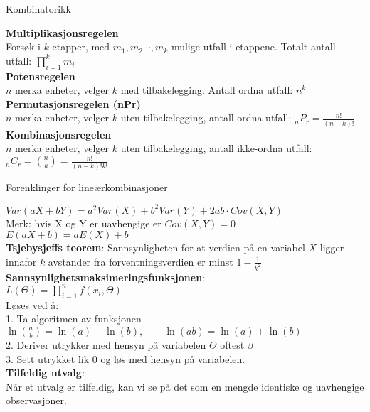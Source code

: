 \documentclass[final,hyperref={pdfpagelabels=false}]{beamer}
\begin{document}
\begin{frame}{} 
	\begin{columns}[t]
		\begin{column}{.33\linewidth}
			\begin{block}{}
				\center\normalsize Kombinatorikk\\
				{\footnotesize\raggedright
					\textbf{Multiplikasjonsregelen}\\
					Forsøk i $k$ etapper, med $m_1,m_2 \cdots,m_k$ mulige utfall i etappene. Totalt antall utfall: $\prod_{i=1}^k m_i$\\
					\textbf{Potensregelen}\\
					$n$ merka enheter, velger $k$ med tilbakelegging. Antall ordna utfall: $n^k$\\
					\textbf{Permutasjonsregelen (nPr)}\\
					$n$ merka enheter, velger $k$ uten tilbakelegging, antall ordna utfall: $_nP_r=\frac{n!}{(n-k)!}$\\
					\textbf{Kombinasjonsregelen}\\
					$n$ merka enheter, velger $k$ uten tilbakelegging, antall ikke-ordna utfall: $_nC_r=\binom{n}{k}=\frac{n!}{(n-k)!k!}$
				}
				\center\normalsize Forenklinger for lineærkombinasjoner\\
				{\footnotesize\raggedright
					$Var(aX+bY)=a^2Var(X)+b^2Var(Y)+2ab\cdot Cov(X,Y)$\\
					Merk: hvis X og Y er uavhengige er $Cov(X,Y)=0$\\
					$E(aX+b)=aE(X)+b$\\
					\textbf{Tsjebysjeffs teorem}: Sannsynligheten for at verdien på en variabel $X$ ligger innafor $k$ avstander fra forventningsverdien er minst $1-\frac{1}{k^2}$\\
					\textbf{Sannsynlighetsmaksimeringsfunksjonen}:\\
					$L(\Theta)=\prod_{i=1}^n f(x_i,\Theta)$\\
					Løses ved å:\\
					1. Ta algoritmen av funksjonen\\
					$\ln \left(\frac{a}{b}\right)=\ln(a)-\ln(b),\qquad \ln(ab)=\ln(a)+\ln(b)$\\
					2. Deriver utrykker med hensyn på variabelen $\Theta$ oftest $\beta$\\
					3. Sett utrykket lik $0$ og løs med hensyn på variabelen.\\
					\textbf{Tilfeldig utvalg}:\\
					Når et utvalg er tilfeldig, kan vi se på det som en mengde identiske og uavhengige observasjoner.\\
}
\end{block}
\end{column}
\end{columns}
\end{frame}
\end{document}
